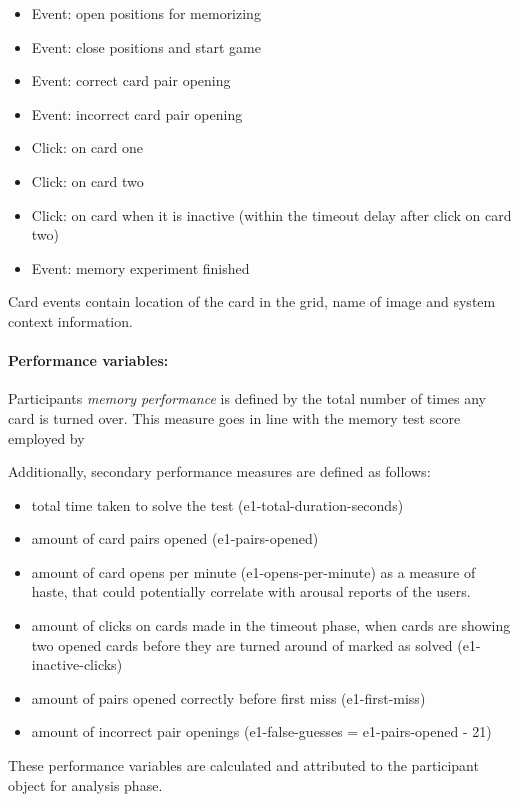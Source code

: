		\begin{itemize}
			\item Event: open positions for memorizing
			\item Event: close positions and start game
			\item Event: correct card pair opening
			\item Event: incorrect card pair opening
			\item Click: on card one
			\item Click: on card two
			\item Click: on card when it is inactive (within the timeout delay after click on card two)
			\item Event: memory experiment finished
		\end{itemize}
		
		Card events contain location of the card in the grid, name of image and system context information.
		
		\paragraph{Performance variables:} \label{sec:memory-parameters} Participants \textit{memory performance} is defined by the total number of times any card is turned over. This measure goes in line with the memory test score employed by \cite{McBurney1997}
		
		Additionally, secondary performance measures are defined as follows:
		
		\begin{itemize}
			\item total time taken to solve the test (e1-total-duration-seconds)
			\item amount of card pairs opened (e1-pairs-opened)
			\item amount of card opens per minute (e1-opens-per-minute) as a measure of haste, that could potentially correlate with arousal reports of the users.
			\item amount of clicks on cards made in the timeout phase, when cards are showing two opened cards before they are turned around of marked as solved (e1-inactive-clicks)
			\item amount of pairs opened correctly before first miss (e1-first-miss)
			\item amount of incorrect pair openings (e1-false-guesses = e1-pairs-opened - 21)
		\end{itemize}
	
		These performance variables are calculated and attributed to the participant object for analysis phase.
		
